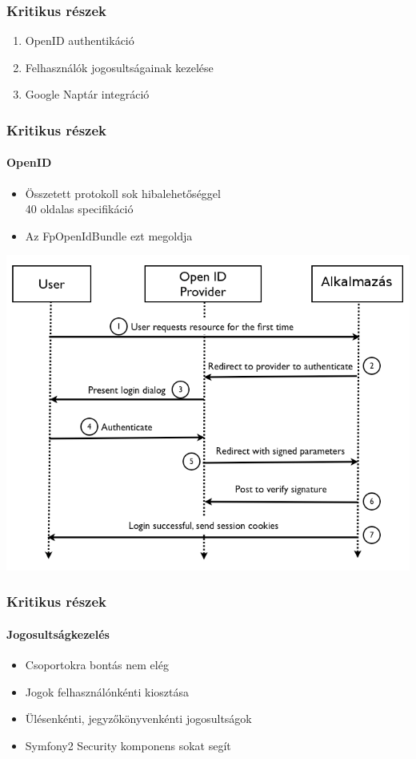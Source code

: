 \documentclass[11pt]{beamer}
\begin{document}
\begin{frame}
    \frametitle{Kritikus részek}
    
    \begin{enumerate}
        \item OpenID authentikáció
        \item Felhasználók jogosultságainak kezelése
        \item Google Naptár integráció
    \end{enumerate}
\end{frame}

\begin{frame}
    \frametitle{Kritikus részek}
    \framesubtitle{OpenID}
    
    \begin{itemize}
        \item Összetett protokoll sok hibalehetőséggel\\
            \small{40 oldalas specifikáció}
        \item Az FpOpenIdBundle ezt megoldja
    \end{itemize}

    \begin{center}
    \includegraphics[height=0.5\textheight,center]{openid.png}
    \end{center}
\end{frame}

\begin{frame}
    \frametitle{Kritikus részek}
    \framesubtitle{Jogosultságkezelés}
    
    \begin{itemize}
        \item Csoportokra bontás nem elég
        \item Jogok felhasználónkénti kiosztása
        \item Ülésenkénti, jegyzőkönyvenkénti jogosultságok
        \item Symfony2 Security komponens sokat segít
    \end{itemize}
\end{frame}
\end{document}
